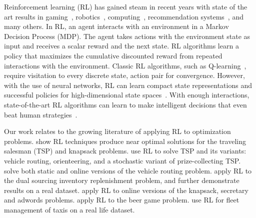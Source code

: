 \documentclass{article}
\begin{document}
Reinforcement learning (RL) has gained steam in recent years with state of the art results in gaming~\cite{mnih2013playing,silver2017mastering}, robotics~\cite{hwangbo2019learning,andrychowicz2018learning}, computing~\cite{mao2017neural, marcus2018towards,mirhoseini2017device}, recommendation systems~\cite{chen2019top,zhao2018deep}, and many others. In RL, an agent interacts with an environment in a Markov Decision Process (MDP). The agent takes actions with the environment state as input and receives a scalar reward and the next state. RL algorithms learn a policy that maximizes the cumulative discounted reward from repeated interactions with the environment. Classic RL algorithms, such as Q-learning~\cite{watkins1992q}, require visitation to every discrete state, action pair for convergence. However, with the use of neural networks, RL can learn compact state representations and successful policies for high-dimensional state spaces~\cite{riedmiller2005neural,mnih2013playing}. With enough interactions, state-of-the-art RL algorithms can learn to make intelligent decisions that even beat human strategies~\cite{silver2017mastering}.

Our work relates to the growing literature of applying RL to optimization problems. \citet{bello2016neural} show RL techniques produce near optimal solutions for the traveling salesman (TSP) and knapsack problems. \citet{kool2018attention} use RL to solve TSP and its variants: vehicle routing, orienteering, and a stochastic variant of prize-collecting TSP. \citet{nazari2018reinforcement} solve both static and online versions of the vehicle routing problem. \citet{gijsbrechts2018can} apply RL to the dual sourcing inventory replenishment problem, and further demonstrate results on a real dataset. \citet{kong2018new} apply RL to online versions of the knapsack, secretary and adwords problems. \citet{oroojlooyjadid2017deep} apply RL to the beer game problem. \citet{lin2018efficient} use RL for fleet management of taxis on a real life dataset. 
\end{document}
